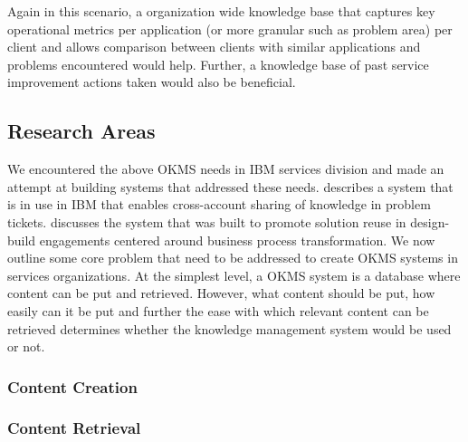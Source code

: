 Again in this scenario, a organization wide knowledge base that captures key operational metrics per application (or more granular such as problem area) per client and allows comparison between clients with similar applications and problems encountered would help. Further, a knowledge base of past service improvement actions taken would also be beneficial.

\subsection{Research Areas}

We encountered the above OKMS needs in IBM services division and made an attempt at building systems that addressed these needs. \cite{} describes a system that is in use in IBM that enables cross-account sharing of knowledge in problem tickets. \cite{} discusses the system that was built to promote solution reuse in design-build engagements centered around business process transformation. We now outline some core problem that need to be addressed to create OKMS systems in services organizations. At the simplest level, a OKMS system is a database where content can be put and retrieved. However, what content should be put, how easily can it be put and further the ease with which relevant content can be retrieved determines whether the knowledge management system would be used or not. 

\subsubsection{Content Creation}

\subsubsection{Content Retrieval}


